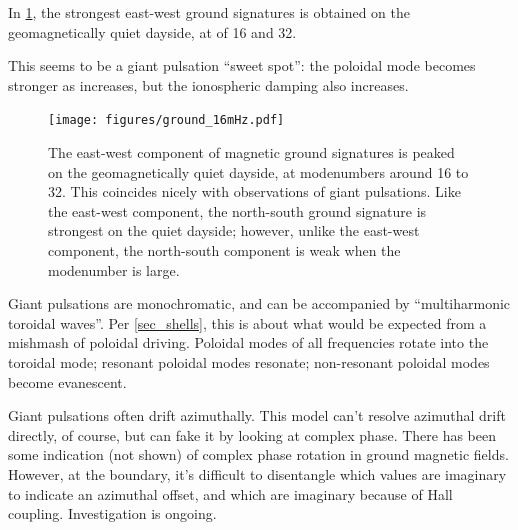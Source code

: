 In \cref{fig_ground_signatures}, the strongest east-west ground signatures is obtained on the geomagnetically quiet dayside, at \azm of 16 and 32. 

This seems to be a giant pulsation ``sweet spot'': the poloidal mode becomes stronger as \azm increases, but the ionospheric damping also increases. 

\begin{figure}[H]
    \centering
    \texttt{[image: figures/ground\_16mHz.pdf]}
    \caption[Dayside Ground Magnetic Fields]{
      The east-west component of magnetic ground signatures is peaked on the geomagnetically quiet dayside, at modenumbers around 16 to 32. This coincides nicely with observations of giant pulsations. Like the east-west component, the north-south ground signature is strongest on the quiet dayside; however, unlike the east-west component, the north-south component is weak when the modenumber is large. 
    }
    \label{fig_ground_signatures}
\end{figure}

Giant pulsations are monochromatic, and can be accompanied by ``multiharmonic toroidal waves''\cite{takahashi_2011}. Per \cref{sec_shells}, this is about what would be expected from a mishmash of poloidal driving. Poloidal modes of all frequencies rotate into the toroidal mode; resonant poloidal modes resonate; non-resonant poloidal modes become evanescent. 

Giant pulsations often drift azimuthally. This model can't resolve azimuthal drift directly, of course, but can fake it by looking at complex phase. There has been some indication (not shown) of complex phase rotation in ground magnetic fields. However, at the boundary, it's difficult to disentangle which values are imaginary to indicate an azimuthal offset, and which are imaginary because of Hall coupling. Investigation is ongoing. 




